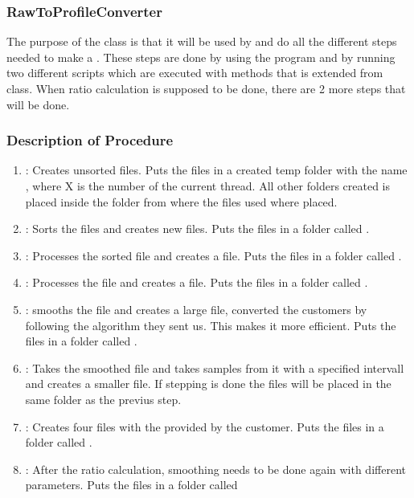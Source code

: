 \subsubsection{RawToProfileConverter}
The purpose of the  class is that it will be used by
 and do all the different steps needed to make a . These steps are done by using the program  and by running
two different scripts which are executed with methods that is extended from
 class. When ratio calculation is supposed to be done, there are 2 more steps that will be done.

\subsubsection{Description of Procedure}

\begin{enumerate}
\item {}: Creates unsorted  files. Puts the files in a
created temp folder with the name , where X is the number of the current thread. All other folders created is placed inside the folder from where the files used where placed.

\item {}: Sorts the  files and creates new 
files. Puts the files in a folder called .

\item {}: Processes the sorted  file and creates a
 file. Puts the files in a folder called .

\item {}: Processes the  file and creates a 
file. Puts the files in a folder called .

\item {}: smooths the file and creates a large  file,
converted the customers  by following the algorithm they  sent
us. This makes it more efficient. Puts the files in a folder called
.

\item {}: Takes the smoothed  file and takes samples from it
with a specified intervall and creates a smaller  file. If stepping is done the files will be placed in the same folder as the previus step.

\item {}: Creates four  files with the
provided by the customer. Puts the files in a folder called .

\item {}: After the ratio calculation, smoothing needs to be done
again with different parameters. Puts the files in a folder called
\end{enumerate}


